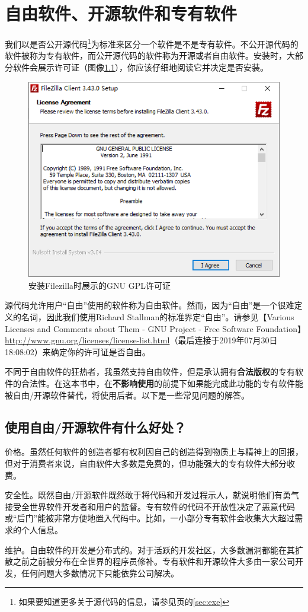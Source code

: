 \chapter{自由软件、开源软件和专有软件}
我们以是否公开源代码\footnote{如果要知道更多关于源代码的信息，请参见\pageref{sec:exe}页的\ref{sec:exe}}为标准来区分一个软件是不是专有软件。不公开源代码的软件被称为专有软件，而公开源代码的软件称为开源或者自由软件。安装时，大部分软件会展示许可证（图像\ref{Fig:FileZillaGPL}），你应该仔细地阅读它并决定是否安装。
\begin{figure}[h]
\centering
	\includegraphics[scale=0.5]{pic/fzi}
	\caption{安装Filezilla时展示的GNU GPL许可证}
	\label{Fig:FileZillaGPL}
\end{figure}
源代码允许用户“自由”使用的软件称为自由软件。然而，因为“自由”是一个很难定义的名词，因此我们使用Richard Stallman的标准界定“自由”。请参见【Various Licenses and Comments about Them - GNU Project - Free Software Foundation】\url{http://www.gnu.org/licenses/license-list.html}（最后连接于2019年07月30日18:08:02）来确定你的许可证是否自由。\par
不同于自由软件的狂热者，我虽然支持自由软件，但是承认拥有\textbf{合法版权}的专有软件的合法性。在这本书中，在\textbf{不影响使用}的前提下如果能完成此功能的专有软件能被自由/开源软件替代，将使用后者。以下是一些常见问题的解答。
\section{使用自由/开源软件有什么好处？}
价格。虽然任何软件的创造者都有权利因自己的创造得到物质上与精神上的回报，但对于消费者来说，自由软件大多数是免费的，但功能强大的专有软件大部分收费。\par
安全性。既然自由/开源软件既然敢于将代码和开发过程示人，就说明他们有勇气接受全世界软件开发者和用户的监督。专有软件的代码不开放性决定了恶意代码或“后门”能被非常方便地置入代码中。比如，一小部分专有软件会收集大大超过需求的个人信息。\par
维护。自由软件的开发是分布式的。对于活跃的开发社区，大多数漏洞都能在其扩散之前之前被分布在全世界的程序员修补。专有软件和开源软件大多由一家公司开发，任何问题大多数情况下只能依靠公司解决。
